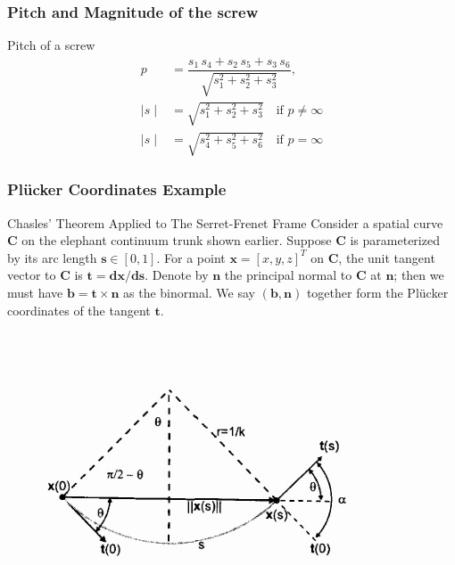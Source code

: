 \begin{frame}
	\frametitle{Pitch and Magnitude of the screw}	
	\begin{block}{Pitch of a screw}
		\begin{align}
			p &= \dfrac{s_1 \, s_4 + s_2 \, s_5 + s_3 \, s_6}{\sqrt{s_1^2 + s_2^2 + s_3^2}}, \\
			\mid s \mid &= \sqrt{s_1^2 + s_2^2 + s_3^2} \quad \text{if } p \neq \infty \\
			\mid s \mid &= \sqrt{s_4^2 + s_5^2 + s_6^2} \quad \text{if } p = \infty
		\end{align}
	\end{block}
\end{frame}
%
\begin{frame}
	\frametitle{Pl{\"u}cker Coordinates Example}
	\begin{block}{Chasles' Theorem Applied to The Serret-Frenet Frame}
		Consider a spatial curve $\bm{C}$ on the elephant continuum trunk shown earlier. Suppose $\bm{C}$ is parameterized by its arc length $\bm{s} \in [0, 1]$. For a point $\bm{x}=\left[x, y, z\right]^T$ on $\bm{C}$, the unit tangent vector to $\bm{C}$ is $\bm{t}=\bm{dx}/\bm{ds}$. Denote by $\bm{n}$ the principal normal to $\bm{C}$ at $\bm{n}$; then we must have $\bm{b}=\bm{t}\times \bm{n}$ as the binormal. We say $(\bm{b},\bm{n})$ together form the Pl{\"u}cker coordinates of the tangent $\bm{t}$.
	\end{block}
	\begin{columns}[]
		\begin{column}{.5\columnwidth}
			\centering
			\includegraphics[width=\textwidth]{figures/serret.jpg}
		\end{column}
	\end{columns}
\end{frame}

